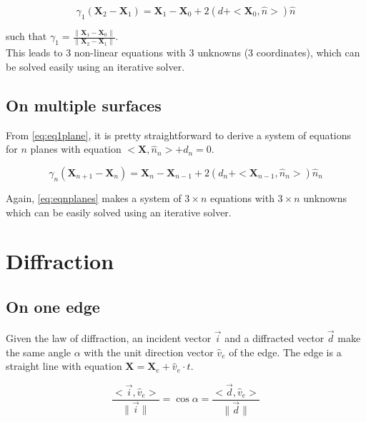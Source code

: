 \documentclass[french,10pt]{article}
\begin{document}
    \begin{equation}\label{eq:eq1plane}
        {\gamma_1}\left(\pmb{X}_2 - \pmb{X}_1 \right) = \pmb{X}_1 - \pmb{X}_0 + 2\left(d + <\pmb{X}_0, \hat{n} > \right)\hat{n}
    \end{equation}
    
    such that $\gamma_1 = \frac{\|\pmb{X}_1 - \pmb{X}_0\|}{\|\pmb{X}_2 - \pmb{X}_1\|}$.\\
    
    This leads to 3 non-linear equations with 3 unknowns (3 coordinates), which can be solved easily using an iterative solver.
    
    \subsection{On multiple surfaces}
    
    From \eqref{eq:eq1plane}, it is pretty straightforward to derive a system of equations for $n$ planes with equation $<\pmb{X},\hat{n}_n> + d_n = 0$.
    
    \begin{equation}\label{eq:eqnplanes}
        {\gamma_n}\left(\pmb{X}_{n+1} - \pmb{X}_n \right) = \pmb{X}_n - \pmb{X}_{n-1} + 2\left(d_n + <\pmb{X}_{n-1}, \hat{n}_n > \right)\hat{n}_n
    \end{equation}
    
    Again, \eqref{eq:eqnplanes} makes a system of $3\times n$ equations with $3 \times n$ unknowns which can be easily solved using an iterative solver.
    
\section{Diffraction}

    \subsection{On one edge}
    
    Given the law of diffraction, an incident vector $\vec{i}$ and a diffracted vector $\vec{d}$ make the same angle $\alpha$ with the unit direction vector $\hat{v}_e$ of the edge. The edge is a straight line with equation $\pmb{X} = \pmb{X}_e + \hat{v}_e \cdot t$.
    
    \begin{equation}
        \frac{<\vec{i}, \hat{v}_e>}{\|\vec{i}\|} = \cos\alpha = \frac{<\vec{d}, \hat{v}_e>}{\|\vec{d}\|}
    \end{equation}
    
\end{document}
